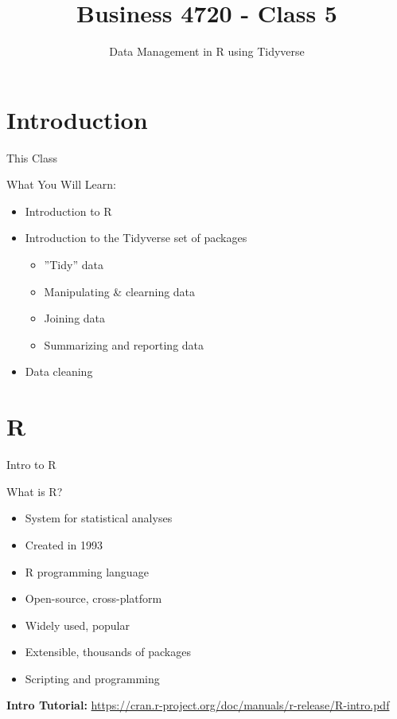 \documentclass[ignorenonframetext,xcolor=x11names]{beamer}
\title{Business 4720 - Class 5}
\subtitle{Data Management in R using Tidyverse}
\begin{document}
\begin{frame}{}
  \titlepage
  \footnotesize
  
\end{frame}

\section{Introduction}

\begin{frame}{This Class}

\begin{block}{What You Will Learn:}
\begin{itemize}
  \item Introduction to R
  \item Introduction to the Tidyverse set of packages
  \begin{itemize}
  \item ''Tidy'' data
  \item Manipulating \& clearning data
  \item Joining data
  \item Summarizing and reporting data
  \end{itemize}
  \item Data cleaning
\end{itemize}
\end{block}
\end{frame}

\section{R}

\begin{frame}{Intro to R}
\begin{block}{What is R?}
\begin{itemize}
  \item System for statistical analyses
  \item Created in 1993
  \item R programming language
  \item Open-source, cross-platform
  \item Widely used, popular
  \item Extensible, thousands of packages
  \item Scripting and programming
\end{itemize}  
\end{block}
\vspace{5mm}
\textbf{Intro Tutorial:}
\url{https://cran.r-project.org/doc/manuals/r-release/R-intro.pdf}
\end{frame}
\end{document}
